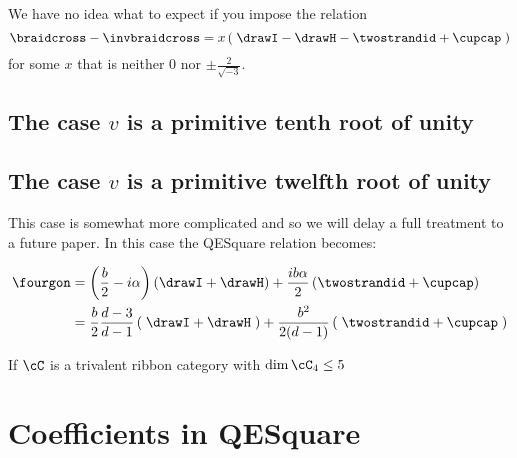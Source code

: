 \documentclass[12pt]{amsart}
\begin{document}
We have no idea what to expect if you impose the relation
$$\braidcross - \invbraidcross = x \left(\;\drawI - \drawH - \twostrandid + \cupcap \; \right)$$ 
for some $x$ that is neither $0$ nor $\pm \frac{2}{\sqrt{-3}}$.


\subsection{The case \texorpdfstring{$v$}{v} is a primitive tenth root of unity}



\subsection{The case \texorpdfstring{$v$}{v} is a primitive twelfth root of unity}

This case is somewhat more complicated and so we will delay a full treatment to a future paper.  In this case the QESquare relation becomes:

\begin{align*}
\fourgon &= \left(\frac{b}{2} - i \alpha\right) \left(\drawI + \drawH\right) + \frac{i b \alpha}{2} \left(\twostrandid + \cupcap\right) \\
&= \frac{b}{2}\frac{d-3}{d-1} \left(\;\drawI + \drawH\;\right) + \frac{b^2}{2(d-1)} \left(\;\twostrandid + \cupcap\;\right)
\end{align*}

\begin{lemma}
If $\cC$ is a trivalent ribbon category with $\dim \cC_4 \leq 5$ 
\end{lemma}


\appendix
\section{Coefficients in QESquare}
\label{app:coefficients}

\nn{}

\renewcommand*{\bibfont}{\small}
\setlength{\bibitemsep}{0pt}
\raggedright
\printbibliography
\end{document}
